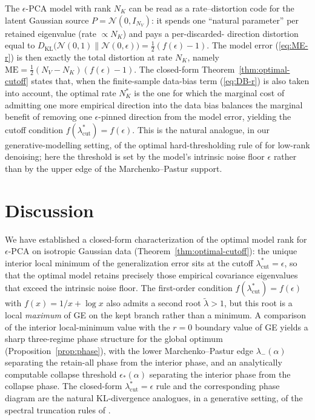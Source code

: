 \documentclass[11pt,a4paper]{article}
\theoremstyle{definition}
\theoremstyle{remark}
\newcommand{\KL}{D_{\mathrm{KL}}}
\newcommand{\PV}{P}
\newcommand{\NK}{N_K}
\newcommand{\NV}{N_V}
\begin{document}
The $\epsilon$-PCA model with rank $\NK$ can be read as a
rate--distortion code for the latent Gaussian source $\PV =
\mathcal{N}(0,I_{\NV})$: it spends one ``natural parameter'' per
retained eigenvalue (rate $\propto \NK$) and pays a per-discarded-
direction distortion equal to $\KL\!\big(\mathcal{N}(0,1)\|
\mathcal{N}(0,\epsilon)\big) = \tfrac{1}{2}(f(\epsilon) - 1)$.
The model error (\ref{eq:ME-r}) is then exactly the total
distortion at rate $\NK$, namely
$\mathrm{ME} = \tfrac{1}{2}(\NV - \NK)(f(\epsilon) - 1)$.
The closed-form Theorem~\ref{thm:optimal-cutoff} states that,
when the finite-sample data-bias term (\ref{eq:DB-r}) is also
taken into account, the optimal rate $\NK^{*}$ is the one for
which the marginal cost of admitting one more empirical
direction into the data bias balances the marginal benefit of
removing one $\epsilon$-pinned direction from the model error,
yielding the cutoff condition
$f(\lambda_{\mathrm{cut}}^{*}) = f(\epsilon)$. This is the natural
analogue, in our generative-modelling setting, of the optimal
hard-thresholding rule of \cite{GavishDonoho2014} for low-rank
denoising; here the threshold is set by the model's intrinsic
noise floor $\epsilon$ rather than by the upper edge of the
Marchenko--Pastur support.

\section{Discussion}
\label{sec:discussion}

We have established a closed-form characterization of the optimal
model rank for $\epsilon$-PCA on isotropic Gaussian data
(Theorem~\ref{thm:optimal-cutoff}): the unique interior local
minimum of the generalization error sits at the cutoff
$\lambda_{\mathrm{cut}}^{*} = \epsilon$, so that the optimal model
retains precisely those empirical covariance eigenvalues that
exceed the intrinsic noise floor. The first-order condition
$f(\lambda_{\mathrm{cut}}^{*}) = f(\epsilon)$ with
$f(x) = 1/x + \log x$ also admits a second root
$\widetilde{\lambda} > 1$, but this root is a local
\emph{maximum} of GE on the kept branch rather than a minimum.
A comparison of the interior local-minimum value with the $r = 0$
boundary value of GE yields a sharp three-regime phase structure
for the global optimum (Proposition~\ref{prop:phase}), with the
lower Marchenko--Pastur edge $\lambda_{-}(\alpha)$ separating the
retain-all phase from the interior phase, and an analytically
computable collapse threshold $\epsilon_{*}(\alpha)$ separating
the interior phase from the collapse phase. The closed-form
$\lambda_{\mathrm{cut}}^{*} = \epsilon$ rule and the corresponding
phase diagram are the natural KL-divergence analogues, in a
generative setting, of the spectral truncation rules of
\cite{GavishDonoho2014,Veraart2016MPPCA}.
\end{document}
